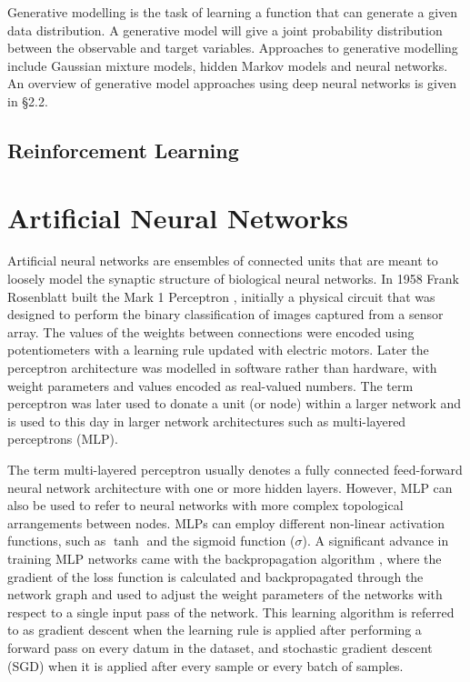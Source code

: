 Generative modelling is the task of learning a function that can generate a given data distribution. 
A generative model will give a joint probability distribution between the observable and target variables. 
Approaches to generative modelling include Gaussian mixture models, hidden Markov models and neural networks. 
An overview of generative model approaches using deep neural networks is given in \S2.2.

\subsection{Reinforcement Learning}
\label{c2:subsec:reinforcement}

\section{Artificial Neural Networks}

Artificial neural networks are ensembles of connected units that are meant to loosely model the synaptic structure of biological neural networks. 
In 1958 Frank Rosenblatt built the Mark 1 Perceptron \citep{rosenblatt1958perceptron}, initially a physical circuit that was designed to perform the binary classification of images captured from a sensor array. 
The values of the weights between connections were encoded using potentiometers with a learning rule updated with electric motors. 
Later the perceptron architecture was modelled in software rather than hardware, with weight parameters and values encoded as real-valued numbers. 
The term perceptron was later used to donate a unit (or node) within a larger network and is used to this day in larger network architectures such as multi-layered perceptrons (MLP). 

The term multi-layered perceptron usually denotes a fully connected feed-forward neural network architecture with one or more hidden layers. 
However, MLP can also be used to refer to neural networks with more complex topological arrangements between nodes. 
MLPs can employ different non-linear activation functions, such as $\tanh$ and the sigmoid function ($\sigma$). 
A significant advance in training MLP networks came with the backpropagation algorithm \citep{werbos1974beyond}, where the gradient of the loss function is calculated and backpropagated through the network graph and used to adjust the weight parameters of the networks with respect to a single input pass of the network. 
This learning algorithm is referred to as gradient descent when the learning rule is applied after performing a forward pass on every datum in the dataset, and stochastic gradient descent (SGD) when it is applied after every sample or every batch of samples. 

